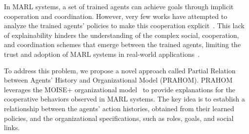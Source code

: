 \documentclass{ecai}
\newcounter{relation}
\begin{document}
In MARL systems, a set of trained agents can achieve goals through implicit cooperation and coordination. However, very few works have attempted to analyze the trained agents' policies to make this cooperation explicit~\citep{albrecht2018survey,perolat2017pool}. This lack of explainability hinders the understanding of the complex social, cooperation, and coordination schemes that emerge between the trained agents, limiting the trust and adoption of MARL systems in real-world applications~\citep{kok2006collaborative,omidshafiei2019learning}.

To address this problem, we propose a novel approach called Partial Relation between Agents' History and Organizational Model (PRAHOM). PRAHOM leverages the MOISE+ organizational model~\citep{hubner2007moise} to provide explanations for the cooperative behaviors observed in MARL systems. The key idea is to establish a relationship between the agents' action histories, obtained from their learned policies, and the organizational specifications, such as roles, goals, and social links.
\end{document}
